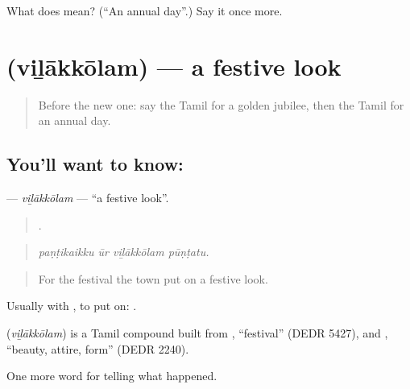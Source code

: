 \begin{tcolorbox}[breakable,colback=teal!4,colframe=teal!35!black,title={Before you move on}]
What does  mean? (\textquotedblleft{}An annual day\textquotedblright{}.) Say it once more.
\end{tcolorbox}
\section[\texorpdfstring{\ta{விழாக்கோலம்} (viḻākkōlam)}{விழாக்கோலம் (viḻākkōlam)}]{ (viḻākkōlam) — a festive look}

\label{lesson:TA-C319-vilakkolam}



\begin{quote}
Before the new one: say the Tamil for a golden jubilee, then the Tamil for an annual day.
\end{quote}

\subsection*{You'll want to know: }
\textbf{} — \emph{viḻākkōlam} — \textquotedblleft{}a festive look\textquotedblright{}.

\begin{quote}
   .
\end{quote}

\begin{quote}
\emph{paṇṭikaikku ūr viḻākkōlam pūṇṭatu.}
\end{quote}

\begin{quote}
For the festival the town put on a festive look.
\end{quote}

Usually with , to put on:  .

\begin{cousinweb}
\textbf{} (\emph{viḻākkōlam}) is a Tamil compound built from , \textquotedblleft{}festival\textquotedblright{} (DEDR 5427), and , \textquotedblleft{}beauty, attire, form\textquotedblright{} (DEDR 2240).
\end{cousinweb}

\begin{grammarlens}[title={What you've built}]
One more word for telling what happened.
\end{grammarlens}


